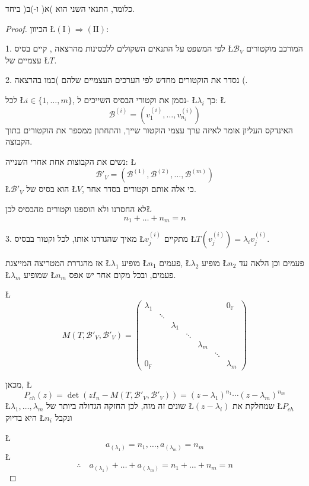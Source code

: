 \documentclass[english,hebrew]{article}
\begin{document}
כלומר, התנאי השני הוא )א( ו-)ב( ביחד.
\begin{proof}
הכיוון \L{$(\text{I})\Rightarrow(\text{II})$}:

1. לפי המשפט על התנאים השקולים ללכסינות מהרצאה {\endL}, קיים
בסיס \L{$\mathcal{B}_{V}$} המורכב מוקטורים עצמיים של \L{$T$}.

2. נסדר את הוקטורים מחדש לפי הערכים העצמיים שלהם )כמו בהרצאה {\endL}(.

לכל \L{$i\in\{1,\dots,m\}$}, נסמן את וקטורי הבסיס השייכים ל- \L{$\lambda_{i}$}
כך: \L{%
\[
\mathcal{B}^{(i)}=(v_{1}^{(i)},\dots,v_{n_{i}}^{(i)})
\]
}%
האינדקס העליון אומר לאיזה ערך עצמי הוקטור שייך, והתחתון ממספר את הוקטורים
בתוך הקבוצה. 

נשים את הקבוצות אחת אחרי השנייה: \L{%
\[
\mathcal{B}'_{V}=(\mathcal{B}^{(1)},\mathcal{B}^{(2)},\dots,\mathcal{B}^{(m)})
\]
}%
\L{$\mathcal{B}'_{V}$} הוא בסיס של \L{$V$}, כי אלה אותם וקטורים
בסדר אחר.

לא החסרנו ולא הוספנו וקטורים מהבסיס לכן\L{%
\[
n_{1}+\dots+n_{m}=n
\]
}%

3. מאיך שהגדרנו אותו, לכל וקטור בבסיס \L{$v_{j}^{(i)}$} מתקיים \L{$T\left(v_{j}^{(i)}\right)=\lambda_{i}v_{j}^{(i)}$}.

אז מהגדרת המטריצה המייצגת \L{$\lambda_{1}$} מופיע \L{$n_{1}$} פעמים,
\L{$\lambda_{2}$} מופיע \L{$n_{2}$} פעמים וכן הלאה עד \L{$\lambda_{m}$}
שמופיע \L{$n_{m}$} פעמים, ובכל מקום אחר יש אפס.

\L{%
\[
M(T,\mathcal{B}'_{V},\mathcal{B}'_{V})=\begin{pmatrix}\lambda_{1} &  &  &  &  &  & 0_{\mathbb{F}}\\
 & \ddots\\
 &  & \lambda_{1}\\
 &  &  & \ddots\\
 &  &  &  & \lambda_{m}\\
 &  &  &  &  & \ddots\\
0_{\mathbb{F}} &  &  &  &  &  & \lambda_{m}
\end{pmatrix}
\]
}%

מכאן, \L{%
\[
P_{ch}(z)=\det\left(zI_{n}-M(T,\mathcal{B}'_{V},\mathcal{B}'_{V})\right)=(z-\lambda_{1})^{n_{1}}\cdots(z-\lambda_{m})^{n_{m}}
\]
}%
\L{$\lambda_{1},\dots,\lambda_{m}$} שונים זה מזה, לכן החזקה הגדולה
ביותר של \L{$(z-\lambda_{i})$} שמחלקת את \L{$P_{ch}$} היא בדיוק
\L{$n_{i}$} ונקבל

\L{%
\[
a_{\left(\lambda_{1}\right)}=n_{1},\dots,a_{\left(\lambda_{m}\right)}=n_{m}
\]
}%
\L{%
\[
\therefore\quad a_{\left(\lambda_{1}\right)}+\dots+a_{\left(\lambda_{m}\right)}=n_{1}+\dots+n_{m}=n
\]
}%


\end{proof}
\end{document}
